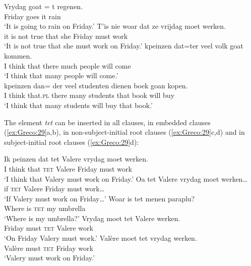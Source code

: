 \documentclass[output=paper]{LSP/langsci}
\begin{document}
\ea%
    \label{ex:Greco:28}
    \ea \label{ex:Greco:28a} \gll Vrydag   goat =  t   regenen.\\
		    Friday   goes {}    it   rain\\
		\glt  ‘It is going to rain on Friday.’
	\ex \label{ex:Greco:28b} \gll T’is     nie woar   dat   ze   vrijdag   moet werken.\\
		    {it is}     not true   that   she   Friday   must work\\
		\glt ‘It is not true that she must work on Friday.’
	\ex \label{ex:Greco:28c} \gll kpeinzen   dat=ter   veel   volk     goat kommen.\\
		    {I think}   {that   there}   much   people   will come\\
		\glt ‘I think that many people will come.’\\
	\ex \label{ex:Greco:28d} \gll kpeinzen   dan=  der   veel studenten   dienen boek   goan kopen.\\
			{I think}   that.\textsc{pl}  there   many students   that   book   will buy\\
		\glt `I think that many students will buy that book.’
	\z
\z

The element \textit{tet} can be inserted in all  clauses, in embedded clauses (\ref{ex:Greco:29}a,b), in non-subject-initial  root clauses (\ref{ex:Greco:29}c,d) and in subject-initial  root clauses (\ref{ex:Greco:29}d):

\ea%
    \label{ex:Greco:29}
    \ea \gll Ik peinzen   dat   tet   Valere   vrydag   moet werken.\\
		    I think   that   \textsc{tet}   Valere   Friday   must work\\
		\glt ‘I think that Valery must work on Friday.’
	\ex \gll Oa   tet   Valere   vrydag   moet werken…\\
			 if   \textsc{tet}  Valere   Friday   must work…\\
		\glt ‘If Valery must work on Friday…’
	\ex \gll Woar     is   tet   menen paraplu?\\
			 Where   is   \textsc{tet}  my umbrella\\
		\glt ‘Where is my umbrella?’
	\ex \gll Vrydag   moet   tet   Valere werken.\\
			 Friday   must   \textsc{tet}  Valere work\\
		\glt ‘On Friday Valery must work.’
	\ex \gll Valère   moet   tet  vrydag   werken.\\
	    	 Valère    must  \textsc{tet}  Friday    work\\
	    \glt `Valery must work on Friday.’
	\z
\z
\end{document}
